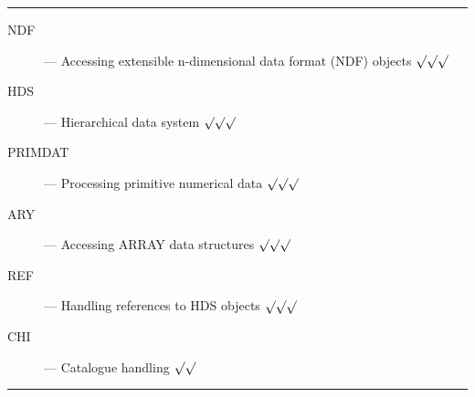 \rule{\textwidth}{0.5mm}
\begin{description}
\begin{description}
\item [NDF] --- Accessing extensible n-dimensional data format (NDF) objects
 \hfill $\surd\surd\surd$
\item [HDS] --- Hierarchical data system \hfill $\surd\surd\surd$
\item [PRIMDAT] --- Processing primitive numerical data \hfill $\surd\surd\surd$
\item [ARY] --- Accessing ARRAY data structures \hfill $\surd\surd\surd$
\item [REF] --- Handling references to HDS objects \hfill $\surd\surd\surd$
\item [CHI] --- Catalogue handling \hfill $\surd\surd$
\end{description}
\end{description}
\rule{\textwidth}{0.5mm}

